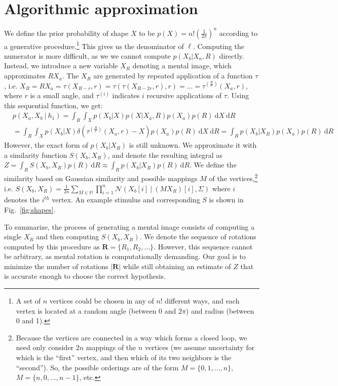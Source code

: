\documentclass{article} %
\begin{document}
\section{Algorithmic approximation}

We define the prior probability of shape $X$ to be
$p(X)=n!\left(\frac{1}{2\pi}\right)^n$ according to a generative
procedure.\footnote{A set of $n$ vertices could be chosen in any of
  $n!$ different ways, and each vertex is located at a random angle
  (between 0 and $2\pi$) and radius (between 0 and 1).} This gives us
the denominator of $\ell$. Computing the numerator is more difficult,
as we we cannot compute $p(X_b\vert X_a, R)$ directly. Instead, we
introduce a new variable $X_R$ denoting a mental image, which
approximates $RX_a$. The $X_R$ are generated by repeated application
of a function $\tau$, i.e. $X_R=RX_a=\tau(X_{R-r},
r)=\tau(\tau(X_{R-2r}, r), r)=\ldots{}=\tau^{(\frac{R}{r})}(X_a, r)$,
where $r$ is a small angle, and $\tau^{(i)}$ indicates $i$ recursive
applications of $\tau$. Using this sequential function, we get:
\begin{align}
  &p(X_a, X_b\ \vert \ h_1)=\int_R \int_{X} p(X_b\vert X) p(X\vert X_a, R)p(X_a)p(R)\ \mathrm{d}X\ \mathrm{d}R \nonumber \\
  &= \int_R \int_X p(X_b\vert X)\delta(\tau^{(\frac{R}{r})}(X_a, r)-X)p(X_a)p(R)\ \mathrm{d}X\ \mathrm{d}R = \int_R p(X_b\vert X_R)p(X_a)p(R)\ \mathrm{d}R
\end{align}
However, the exact form of $p(X_b\vert X_R)$ is still unknown. We
approximate it with a similarity function $S(X_b, X_R)$, and denote
the resulting integral as $Z=\int_R S(X_b, X_R)p(R)\
\mathrm{d}R\approx \int_R p(X_b\vert X_R)p(R)\ \mathrm{d}R$.  We
define the similarity based on Gaussian similarity and possible
mappings $M$ of the vertices,\footnote{Because the vertices are
  connected in a way which forms a closed loop, we need only consider
  $2n$ mappings of the $n$ vertices (we assume uncertainty for which
  is the ``first'' vertex, and then which of its two neighbors is the
  ``second''). So, the possible orderings are of the form
  $M=\lbrace{}0, 1, \ldots{}, n\rbrace{}$, $M=\lbrace{}n, 0, \ldots{},
  n-1\rbrace{}$, etc.} i.e. $S(X_b,
X_R)=\frac{1}{2n}\sum_{M\in\mathbb{M}}\prod_{i=1}^n\mathcal{N}(X_b[i]\
\vert \ (MX_R)[i], \Sigma)$ where $i$ denotes the $i^{th}$ vertex. An
example stimulus and corresponding $S$ is shown in
Fig.~\ref{fig:shapes}.

To summarize, the process of generating a mental image consists of
computing a single $X_R$ and then computing $S(X_b, X_R)$. We denote
the sequence of rotations computed by this procedure as
$\mathbf{R}=\{R_1, R_2, \ldots{}\}$. However, this sequence cannot be
arbitrary, as mental rotation is computationally demanding. Our goal
is to minimize the number of rotations $\vert\mathbf{R}\vert$ while
still obtaining an estimate of $Z$ that is accurate enough to choose
the correct hypothesis.
\end{document}
